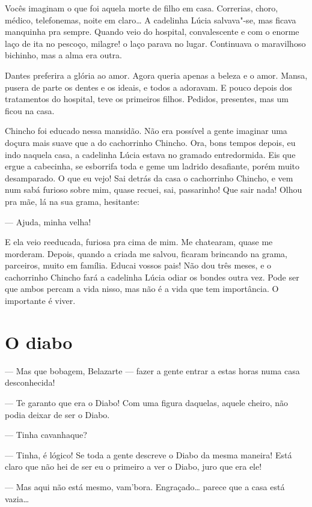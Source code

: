 Vocês imaginam o que foi aquela morte de filho em casa. Correrias,
choro, médico, telefonemas, noite em claro\ldots{} A cadelinha Lúcia
salvava"-se, mas ficava manquinha pra sempre. Quando veio do hospital,
convalescente e com o enorme laço de ita no pescoço, milagre! o laço
parava no lugar. Continuava o maravilhoso bichinho, mas a alma era
outra.

Dantes preferira a glória ao amor. Agora queria apenas a beleza e o
amor. Mansa, pusera de parte os dentes e os ideais, e todos a adoravam.
E pouco depois dos tratamentos do hospital, teve os primeiros filhos.
Pedidos, presentes, mas um ficou na casa.

Chincho foi educado nessa mansidão. Não era possível a gente imaginar
uma doçura mais suave que a do cachorrinho Chincho. Ora, bons tempos
depois, eu indo naquela casa, a cadelinha Lúcia estava no gramado
entredormida. Eis que ergue a cabecinha, se esborrifa toda e geme um
ladrido desafiante, porém muito desamparado. O que eu vejo! Sai detrás
da casa o cachorrinho Chincho, e vem num sabá furioso sobre mim, quase
recuei, sai, passarinho! Que sair nada! Olhou pra mãe, lá na sua grama,
hesitante:

--- Ajuda, minha velha!

E ela veio reeducada, furiosa pra cima de mim. Me chatearam, quase me
morderam. Depois, quando a criada me salvou, ficaram brincando na grama,
parceiros, muito em família. Educai vossos pais! Não dou três meses, e o
cachorrinho Chincho fará a cadelinha Lúcia odiar os bondes outra vez.
Pode ser que ambos percam a vida nisso, mas não é a vida que tem
importância. O importante é viver.

\chapter{O diabo}

--- Mas que bobagem, Belazarte --- fazer a gente entrar a estas horas
numa casa desconhecida!

--- Te garanto que era o Diabo! Com uma figura daquelas, aquele cheiro,
não podia deixar de ser o Diabo.

--- Tinha cavanhaque?

--- Tinha, é lógico! Se toda a gente descreve o Diabo da mesma maneira!
Está claro que não hei de ser eu o primeiro a ver o Diabo, juro que era
ele!

--- Mas aqui não está mesmo, vam'bora. Engraçado\ldots{} parece que a casa
está vazia\ldots{}

